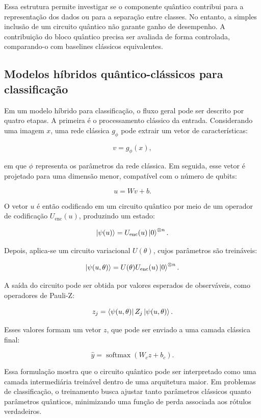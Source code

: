 \documentclass[
    12pt,
    openright,
    oneside,
    a4paper,
    english,
    brazil
]{abntex2}
\begin{document}
Essa estrutura permite investigar se o componente quântico contribui para a representação dos dados ou para a separação entre classes. No entanto, a simples inclusão de um circuito quântico não garante ganho de desempenho. A contribuição do bloco quântico precisa ser avaliada de forma controlada, comparando-o com baselines clássicos equivalentes.

\subsection{Modelos híbridos quântico-clássicos para classificação}

Em um modelo híbrido para classificação, o fluxo geral pode ser descrito por quatro etapas. A primeira é o processamento clássico da entrada. Considerando uma imagem \(x\), uma rede clássica \(g_{\phi}\) pode extrair um vetor de características:

\[
v = g_{\phi}(x),
\]

em que \(\phi\) representa os parâmetros da rede clássica. Em seguida, esse vetor é projetado para uma dimensão menor, compatível com o número de qubits:

\[
u = Wv + b.
\]

O vetor \(u\) é então codificado em um circuito quântico por meio de um operador de codificação \(U_{\text{enc}}(u)\), produzindo um estado:

\[
\ket{\psi(u)}
=
U_{\text{enc}}(u)
\ket{0}^{\otimes n}.
\]

Depois, aplica-se um circuito variacional \(U(\theta)\), cujos parâmetros são treináveis:

\[
\ket{\psi(u,\theta)}
=
U(\theta)
U_{\text{enc}}(u)
\ket{0}^{\otimes n}.
\]

A saída do circuito pode ser obtida por valores esperados de observáveis, como operadores de Pauli-Z:

\[
z_j =
\bra{\psi(u,\theta)}
Z_j
\ket{\psi(u,\theta)}.
\]

Esses valores formam um vetor \(z\), que pode ser enviado a uma camada clássica final:

\[
\hat{y}
=
\operatorname{softmax}(W_c z + b_c).
\]

Essa formulação mostra que o circuito quântico pode ser interpretado como uma camada intermediária treinável dentro de uma arquitetura maior. Em problemas de classificação, o treinamento busca ajustar tanto parâmetros clássicos quanto parâmetros quânticos, minimizando uma função de perda associada aos rótulos verdadeiros.
\end{document}
